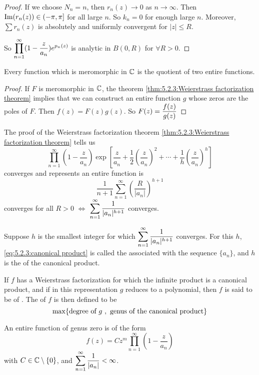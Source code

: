 \begin{proof}
    If we choose  $ N_n=n $, then  $ r_n(z)\rightarrow 0 $ as  $ n\rightarrow\infty $. Then  $ \mathrm{Im} (r_n(z))\in(-\pi,\pi] $ for all large  $ n $. So  $ k_n=0 $ for enough large  $ n $.  
    Moreover,  $ \sum r_n(z) $ is absolutely and uniformly convergent for  $ |z| \leq R $.
    
    So  $ \displaystyle\prod_{n=1}^\infty(1-\frac{z}{a_n})e^{p_n(z)} $ is analytic in  $ B(0,R) $ for  $ \forall R>0 $.    
\end{proof}

\begin{corollary}
    Every function which is meromorphic in  $ \mathbb C  $ is the quotient of two entire functions.
\end{corollary}
\begin{proof}
    If  $ F  $ is meromorphic in  $ \mathbb C  $, the theorem \ref{thm:5.2.3:Weierstrass factorization theorem} implies that we can construct an entire function  $ g  $ whose zeros are the poles of  $ F $. Then  $ f(z)=F(z)g(z) $. So  $ F(z)=\displaystyle\frac{f(z)}{g(z)} $ 
\end{proof}

The proof of the  Weierstrass factorization theorem \ref{thm:5.2.3:Weierstrass factorization theorem} tells us  
\begin{equation}
    \prod_{n=1}^\infty(1-\frac{z}{a_n})\exp\left[\frac{z}{a_n}+\frac{1}{2}\left(\frac{z}{a_n}\right)^2+\cdots+\frac{1}{h}\left(\frac{z}{a_n}\right)^h\right]\label{eq:5.2.3:canonical product}
\end{equation}
converges and represents an entire function is  
\begin{equation}
    \frac{1}{n+1}\sum_{n=1}^\infty\left(\frac{R}{|a_n|}\right)^{h+1}
\end{equation}
converges for all  $ R>0 $ $ \Leftrightarrow $  $ \displaystyle\sum_{n=1}^\infty\frac{1}{|a_n|^{h+1}} $ converges.

Suppose  $ h  $ is the smallest integer for which  $ \displaystyle\sum_{n=1}^\infty \frac{1}{|a_n|^{h+1}} $ converges. For this  $ h  $, \eqref{eq:5.2.3:canonical product} is called the  associated with the sequence  $ \{a_n\} $, and  $ h  $ is the  of the canonical product.

If  $ f  $ has a Weierstrass factorization for which the infinite product is a canonical product, and if in this representation  $ g  $ reduces to a polynomial, then  $ f  $ is said to be of .
The  of  $ f $ is then defined to be  \[\displaystyle\max\{\text{degree of  $ g $ },\text{ genus of the canonical product}\} \]
\begin{example}
    An entire function of genus zero is of the form 
    \begin{equation}
        f(z)=Cz^m\prod_{n=1}^\infty(1-\frac{z}{a_n})
    \end{equation}
    with  $ C\in \mathbb C\setminus\{0\} $, and  $ \displaystyle\sum_{n=1}^\infty\frac{1}{|a_n|}<\infty $. 
\end{example}


